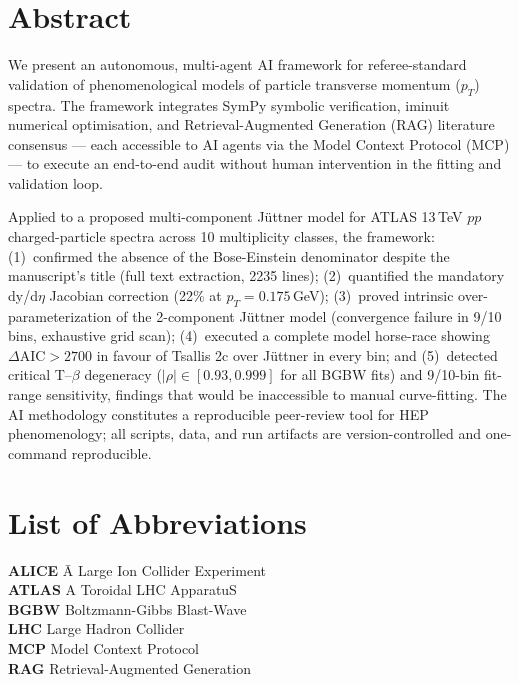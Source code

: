 \documentclass[12pt, a4paper]{report}
\begin{document}
\chapter*{Abstract}
We present an autonomous, multi-agent AI framework for referee-standard validation
of phenomenological models of particle transverse momentum ($p_T$) spectra. The
framework integrates SymPy symbolic verification, iminuit numerical optimisation,
and Retrieval-Augmented Generation (RAG) literature consensus — each accessible to
AI agents via the Model Context Protocol (MCP) — to execute an end-to-end audit
without human intervention in the fitting and validation loop.

Applied to a proposed multi-component J\"uttner model for ATLAS 13\,TeV $pp$
charged-particle spectra across 10 multiplicity classes, the framework: (1)~confirmed
the absence of the Bose-Einstein denominator despite the manuscript's title (full
text extraction, 2235 lines); (2)~quantified the mandatory dy/d$\eta$ Jacobian
correction (22\% at $p_T = 0.175$\,GeV); (3)~proved intrinsic over-parameterization
of the 2-component J\"uttner model (convergence failure in 9/10 bins, exhaustive
grid scan); (4)~executed a complete model horse-race showing $\Delta\text{AIC} > 2700$
in favour of Tsallis 2c over J\"uttner in every bin; and (5)~detected critical
T--$\beta$ degeneracy ($|\rho| \in [0.93, 0.999]$ for all BGBW fits) and 9/10-bin
fit-range sensitivity, findings that would be inaccessible to manual curve-fitting.
The AI methodology constitutes a reproducible peer-review tool for HEP phenomenology;
all scripts, data, and run artifacts are version-controlled and one-command reproducible.

\tableofcontents
\listoffigures
\listoftables
{}

\chapter*{List of Abbreviations}
\begin{tabbing}
\textbf{ALICE} \hspace{1cm} \= A Large Ion Collider Experiment \\
\textbf{ATLAS} \> A Toroidal LHC ApparatuS \\
\textbf{BGBW} \> Boltzmann-Gibbs Blast-Wave \\
\textbf{LHC} \> Large Hadron Collider \\
\textbf{MCP} \> Model Context Protocol \\
\textbf{RAG} \> Retrieval-Augmented Generation \\
\end{tabbing}










\nocite{*}

\end{document}
